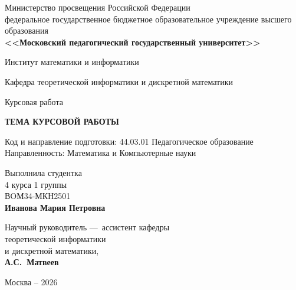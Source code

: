 \thispagestyle{empty} %

\begin{center}
	Министерство просвещения Российской Федерации \\
	федеральное государственное бюджетное образовательное учреждение высшего образования\\
	\textbf{<<Московский педагогический государственный университет>>}
	
	\vspace{10mm}
	
	Институт математики и информатики
	
	\vspace{4mm}
	
	Кафедра теоретической информатики и дискретной математики
	
	\vspace{17mm}
	
	{\fontsize{18}{21.6}\selectfont Курсовая работа}
	
	\vspace{10mm}
	
	\textbf{\fontsize{18}{21.6}\selectfont\MakeTextUppercase{Тема курсовой работы}}
	
	\vspace{10mm}
\end{center}

\hspace{0.5cm}
\begin{minipage}{0.9\textwidth}
	\begin{flushleft}
		\fontsize{12}{14.4}\selectfont Код и направление подготовки: 44.03.01 Педагогическое образование\\
		Направленность: Математика и Компьютерные науки
	\end{flushleft}
\end{minipage}

\vspace{12mm}

\hspace{90mm}
\begin{minipage}{0.38\textwidth}
	\begin{flushleft}
		Выполнила студентка\\
		4 курса 1 группы\\
		ВOМ34-МКН2501\\
		\textbf{Иванова Мария Петровна}
		
		\vspace{7mm}
		
		Научный руководитель ---\
		ассистент кафедры\\
		теоретической информатики\\
		и дискретной математики,\\
		\textbf{А.С.~Матвеев}
	\end{flushleft}
\end{minipage}

\vfill

\begin{center}
	Москва -- 2026
\end{center}
